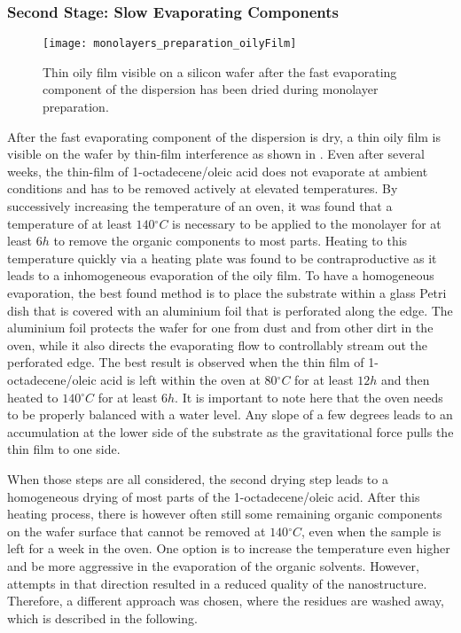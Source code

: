 \documentclass[\main/dresen_thesis.tex]{subfiles}
\begin{document}
  \subsubsection{Second Stage: Slow Evaporating Components}
  \begin{figure}[tb]
    \centering
    \texttt{[image: monolayers\_preparation\_oilyFilm]}
    \caption{\label{fig:monolayers:preparation:dryingConditions:oilyFilm}Thin oily film visible on a silicon wafer after the fast evaporating component of the dispersion has been dried during monolayer preparation.}
  \end{figure}
  After the fast evaporating component of the dispersion is dry, a thin oily film is visible on the wafer by thin-film interference as shown in .
  Even after several weeks, the thin-film of 1-octadecene/oleic acid does not evaporate at ambient conditions and has to be removed actively at elevated temperatures.
  By successively increasing the temperature of an oven, it was found that a temperature of at least $140 \unit{^\circ C}$ is necessary to be applied to the monolayer for at least $6 \unit{h}$ to remove the organic components to most parts.
  Heating to this temperature quickly via a heating plate was found to be contraproductive as it leads to a inhomogeneous evaporation of the oily film.
  To have a homogeneous evaporation, the best found method is to place the substrate within a glass Petri dish that is covered with an aluminium foil that is perforated along the edge.
  The aluminium foil protects the wafer for one from dust and from other dirt in the oven, while it also directs the evaporating flow to controllably stream out the perforated edge.
  The best result is observed when the thin film of 1-octadecene/oleic acid is left within the oven at $80 \unit{^\circ C}$ for at least $12\unit{h}$ and then heated to $140 \unit{^\circ C}$ for at least $6\unit{h}$.
  It is important to note here that the oven needs to be properly balanced with a water level.
  Any slope of a few degrees leads to an accumulation at the lower side of the substrate as the gravitational force pulls the thin film to one side.

  When those steps are all considered, the second drying step leads to a homogeneous drying of most parts of the 1-octadecene/oleic acid.
  After this heating process, there is however often still some remaining organic components on the wafer surface that cannot be removed at $140 \unit{^\circ C}$, even when the sample is left for a week in the oven.
  One option is to increase the temperature even higher and be more aggressive in the evaporation of the organic solvents.
  However, attempts in that direction resulted in a reduced quality of the nanostructure.
  Therefore, a different approach was chosen, where the residues are washed away, which is described in the following.
\end{document}
